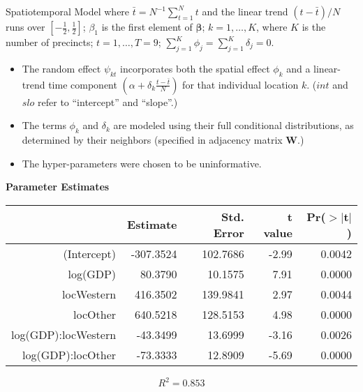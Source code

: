 \documentclass[final]{beamer}
\newlength{\colwidmiddle}
\begin{document}
\begin{frame}[t]
\begin{columns}[t]
\begin{column}{\colwidmiddle}
\begin{alertblock}{Spatiotemporal Model}
\vspace{-.5in}
where $\bar{t} = N^{-1}\sum_{t=1}^N t$ and the linear trend
$(t-\bar{t})/N$ runs over $[-\frac{1}{2}, \frac{1}{2}]$; \quad
$\beta_1$ is the first element of $\mathbf{\beta}$; \quad
$k = 1, \ldots, K$, where $K$ is the number of precincts; \quad
$t=1, \ldots, T=9$; \quad
$\sum_{j=1}^K \phi_j = \sum_{j=1}^K \delta_j = 0$.

\vspace{.5in}

\begin{itemize}
\item The random effect $\psi_{kt}$ incorporates both the spatial
  effect $\phi_k$ and a linear-trend time component $(\alpha +
  \delta_k \frac{t - \bar{t}}{N})$ for that
  individual location $k$. ($int$ and $slo$ refer
  to ``intercept'' and ``slope''.)
\item The terms $\phi_k$ and $\delta_k$ are modeled using their full
  conditional distributions, as determined by their neighbors
  (specified in adjacency matrix $\mathbf{W}$.)
\item The hyper-parameters were chosen to be uninformative.
\end{itemize}




\vspace{1.5in}
\textbf{Parameter Estimates}    
   {\small 
     \begin{table}[ht]
       \centering
       \begin{tabular}{rrrrr}
  \hline
 & Estimate & Std. Error & t value & Pr($>$$|$t$|$) \\ 
  \hline
(Intercept) & -307.3524 & 102.7686 & -2.99 & 0.0042 \\ 
  log(GDP) & 80.3790 & 10.1575 & 7.91 & 0.0000 \\ 
  locWestern & 416.3502 & 139.9841 & 2.97 & 0.0044 \\ 
  locOther & 640.5218 & 128.5153 & 4.98 & 0.0000 \\ 
  log(GDP):locWestern & -43.3499 & 13.6999 & -3.16 & 0.0026 \\ 
  log(GDP):locOther & -73.3333 & 12.8909 & -5.69 & 0.0000 \\ 
   \hline
\end{tabular}
\end{table}} 
  \[
   R^2 = 0.853
  \]

  
  

\end{alertblock}
\end{column}
\end{columns}
\end{frame}
\end{document}
